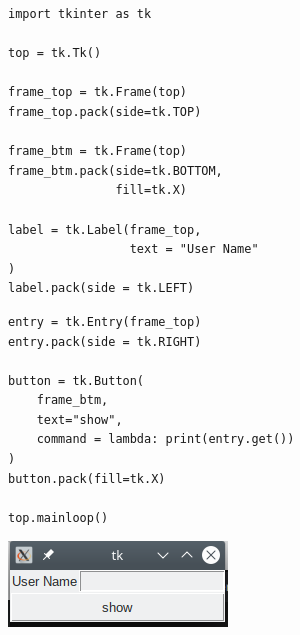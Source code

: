 \begin{frame}[fragile]
%
\begin{tcbraster}[raster columns=2,
                  raster equal height,
                  nobeforeafter,
                  raster column skip=0.5cm]
\begin{codebox}
\begin{verbatim}
import tkinter as tk

top = tk.Tk()

frame_top = tk.Frame(top)
frame_top.pack(side=tk.TOP)

frame_btm = tk.Frame(top)
frame_btm.pack(side=tk.BOTTOM,
               fill=tk.X)

label = tk.Label(frame_top,
                 text = "User Name"
)
label.pack(side = tk.LEFT)
\end{verbatim}
\end{codebox}
%
\begin{codebox}[... Continued]
\begin{verbatim}
entry = tk.Entry(frame_top)
entry.pack(side = tk.RIGHT)

button = tk.Button(
    frame_btm,
    text="show",
    command = lambda: print(entry.get())
)
button.pack(fill=tk.X)

top.mainloop()
\end{verbatim}
\end{codebox}
\end{tcbraster}
%
\begin{center}
	\includegraphics[width=.25\linewidth]{./gfx/12-tk-entry}
\end{center}
%
\end{frame}



